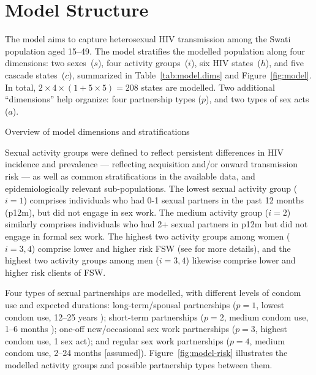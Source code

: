 \section{Model Structure}\label{model.str}
The model aims to capture heterosexual HIV transmission among the Swati population aged 15--49.
The model stratifies the modelled population along four dimensions:
two sexes~($s$), four activity groups~($i$), six HIV states~($h$), and five cascade states~($c$),
summarized in Table~\ref{tab:model.dims} and Figure~\ref{fig:model}.
In total, $2 \times 4 \times (1 + 5 \times 5) = 208$ states are modelled.
Two additional ``dimensions'' help organize:
four partnership types ($p$), and two types of sex acts ($a$).
\begin{table}
  \centering
  \caption{Overview of model dimensions and stratifications}
  \label{tab:model.dims}
  
\end{table}
\par
Sexual activity groups were defined to reflect
persistent differences in HIV incidence and prevalence
\cite{SDHS2006,Bicego2013,Justman2016,SHIMS2}
--- reflecting acquisition and/or onward transmission risk ---
as well as common stratifications in the available data,
and epidemiologically relevant sub-populations.
The lowest sexual activity group ($i=1$) comprises
individuals who had 0-1 sexual partners in the past 12 months (p12m),
but did not engage in sex work.
The medium activity group ($i=2$) similarly comprises
individuals who had 2+ sexual partners in p12m
but did not engage in formal sex work.
The highest two activity groups among women ($i=3,4$) comprise
lower and higher risk FSW (see  for more details), and
the highest two activity groups among men ($i=3,4$) likewise comprise
lower and higher risk clients of FSW.
\par
Four types of sexual partnerships are modelled,
with different levels of condom use and expected durations:
long-term/spousal partnerships ($p=1$, lowest condom use, 12--25 years \cite{??}); %
short-term partnerships ($p=2$, medium condom use, 1--6 months \cite{??}); %
one-off new/occasional sex work partnerships ($p=3$, highest condom use, 1 sex act);
and regular sex work partnerships ($p=4$, medium condom use, 2--24 months [assumed]).
Figure~\ref{fig:model-risk} illustrates
the modelled activity groups and possible partnership types between them.
